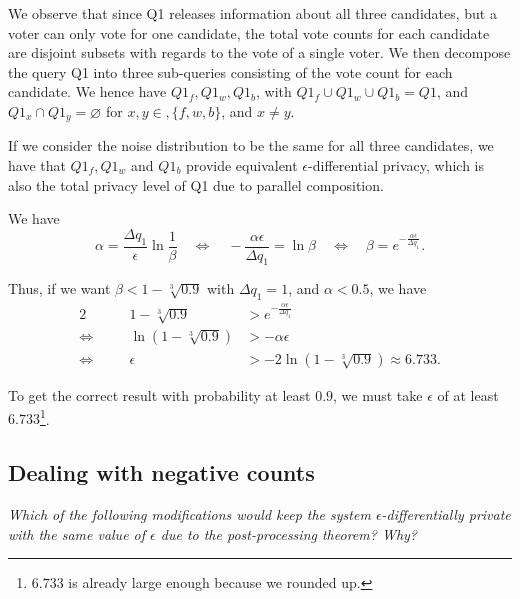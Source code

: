 \documentclass[parskip=half]{scrartcl}
\begin{document}
\begin{enumerate}
    We observe that since Q1 releases information about all three candidates,
    but a voter can only vote for one candidate, the total vote counts for each
    candidate are disjoint subsets with regards to the vote of a single voter.
    We then decompose the query Q1 into three sub-queries consisting of the
    vote count for each candidate. We hence have $Q1_f, Q1_w, Q1_b$, with
    $Q1_f \cup Q1_w \cup Q1_b = Q1$, and $Q1_x \cap Q1_y = \varnothing$ for
    $x, y\in, \{f, w, b\}$, and $x\neq y$.

    If we consider the noise distribution to be the same for all three
    candidates, we have that $Q1_f, Q1_w$ and $Q1_b$ provide equivalent
    $\epsilon$-differential privacy, which is also the total privacy level of
    Q1 due to parallel composition.

    We have
    $$
        \alpha = \frac{\Delta q_1}{\epsilon}\ln{\frac{1}{\beta}}
        \quad\Leftrightarrow\quad
        -\frac{\alpha\epsilon}{\Delta q_1} = \ln{\beta}
        \quad\Leftrightarrow\quad
        \beta = e^{-\frac{\alpha\epsilon}{\Delta q_1}}.
    $$
    
    Thus, if we want $\beta < 1 - \sqrt[3]{0.9}$ with $\Delta q_1 = 1$, and
    $\alpha < 0.5$, we have
    \begin{alignat*}{2}
        \quad &&
            1 - \sqrt[3]{0.9} &> e^{-\frac{\alpha\epsilon}{\Delta q_1}}\\
        \Leftrightarrow\quad &&
            \ln{\left(1 - \sqrt[3]{0.9}\right)} &> -\alpha\epsilon\\
        \Leftrightarrow\quad &&
            \epsilon &> -2 \ln{\left(1 - \sqrt[3]{0.9}\right)} \approx 6.733.
    \end{alignat*}

    To get the correct result with probability at least $0.9$, we must take
    $\epsilon$ of at least $6.733$\footnote{$6.733$ is already large enough
    because we rounded up.}.
\end{enumerate}

\subsection{Dealing with negative counts}

\textit{Which of the following modifications would keep the system
$\epsilon$-differentially private with the same value of $\epsilon$ due to the
post-processing theorem? Why?}
\end{document}
